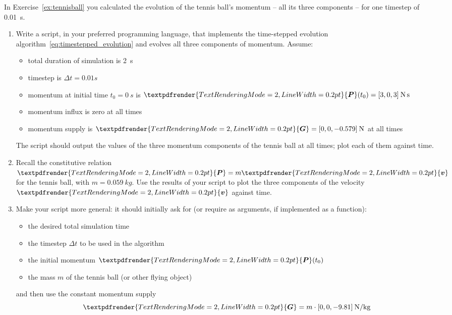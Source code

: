\documentclass[a4paper,12pt,%
onecolumn,oneside,%
british%
]{memoir}
\renewcommand*{\bm}[1]{\textpdfrender{TextRenderingMode=2,LineWidth=0.2pt}{\boldsymbol{#1}}}
\newcommand*{\incr}{\Delta}%
\renewcommand*{\|}[1][]{\nonscript\:#1\vert\nonscript\:\mathopen{}}
\newcommand*{\yv}{\bm{v}}
\newcommand*{\yti}{t_{0}}
\newcommand*{\Dt}{\incr t}
\newcommand*{\yM}{m}%
\newcommand*{\yP}{\bm{P}}
\newcommand*{\yG}{\bm{G}}
\begin{document}
\begin{exercise}[label={ex:tennisball2}]
  In Exercise~\ref{ex:tennisball} you calculated the evolution of the tennis ball's momentum -- all its three components -- for one timestep of \qty{0.01}{s}.

  \begin{enumerate}[exerc]
  \item Write a script, in your preferred programming language, that implements the time-stepped evolution algorithm~\eqref{eq:timestepped_evolution} and evolves all three components of momentum. Assume:
    \begin{itemize}[nosep]
    \item total duration of simulation is \qty{2}{s}
    \item timestep is $\Dt={0.01}{s}$
    \item momentum at initial time $\yti=\qty{0}{s}$ is $\yP(\yti) = [3,0,3]\:\unit{N\,s}$
    \item momentum influx is zero at all times
    \item  momentum supply is $\yG=[0,0,\num{-0.579}]\:\unit{N}$ at all times
    \end{itemize}
    The script should output the values of the three momentum components of the tennis ball at all times; plot each of them against time.

    \smallskip

  \item Recall the constitutive relation $\yP=\yM\yv$ for the tennis ball, with $\yM = \qty{0.059}{kg}$. Use the results of your script to plot the three components of the velocity $\yv$ against time.

    \smallskip

  \item Make your script more general: it should initially ask for (or require as arguments, if implemented as a function):
    \begin{itemize}[nosep]
    \item the desired total simulation time
    \item the timestep $\Dt$ to be used in the algorithm
    \item the initial momentum $\yP(\yti)$
    \item the mass $\yM$ of the tennis ball (or other flying object)
    \end{itemize}
    and then use the constant momentum supply
    \begin{equation*}
      \yG = \yM\cdot [0,0,-9.81]\:\unit{N/kg}
    \end{equation*}
  \end{enumerate}
\end{exercise}
\end{document}
